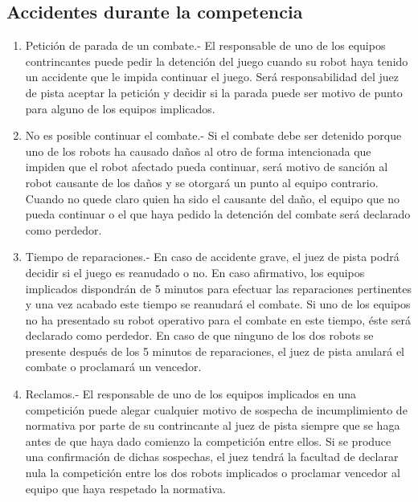 \documentclass[12pt]{book}
\theoremstyle{definition}
\theoremstyle{remark}
\theoremstyle{plain}
\begin{document}
\subsection{Accidentes durante la competencia}
\begin{enumerate}
 \item Petición de parada de un combate.- El responsable de uno de los equipos contrincantes puede pedir la detención 
del juego cuando su robot haya tenido un accidente que le impida continuar el juego. Será responsabilidad del 
juez de pista aceptar la petición y decidir si la parada puede ser motivo de punto para alguno de los equipos implicados. 
 \item No es posible continuar el combate.- Si el combate debe ser detenido porque uno de los robots ha causado daños al otro 
de forma intencionada que impiden que el robot afectado pueda continuar, será motivo de sanción al robot causante de los daños
 y se otorgará un punto al equipo contrario. 
Cuando no quede claro quien ha sido el causante del daño, el equipo que no pueda continuar o el que haya pedido la detención del combate será declarado como perdedor.
 \item Tiempo de reparaciones.- En caso de accidente grave, el juez de pista podrá decidir si el juego es reanudado o no. En caso afirmativo, los equipos implicados 
dispondrán de 5 minutos para efectuar las reparaciones pertinentes y una vez acabado este tiempo se reanudará el combate. Si uno de los equipos
 no ha presentado su robot operativo para el combate en este tiempo, éste será declarado como perdedor. En caso de que ninguno de los dos robots
 se presente después de los 5 minutos de reparaciones, el juez de pista anulará el combate o proclamará un vencedor. 
 \item  Reclamos.- El responsable de uno de los equipos implicados en una competición puede alegar cualquier motivo de sospecha de incumplimiento 
de normativa por parte de su contrincante al juez de pista siempre que se haga antes de que haya dado comienzo la competición entre ellos. Si 
se produce una confirmación de dichas sospechas, el juez tendrá la facultad de declarar nula la competición entre los dos robots implicados 
o proclamar vencedor al equipo que haya respetado la normativa.
\end{enumerate}
\end{document}
